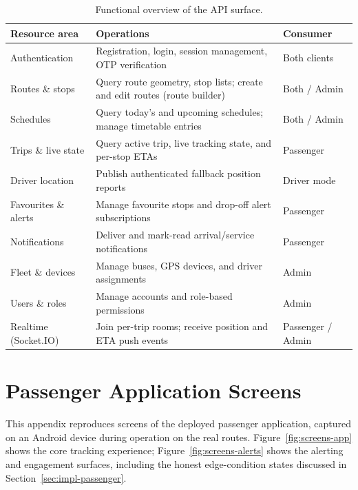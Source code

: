 \begin{table}[H]
\caption{Functional overview of the API surface.}
\label{tab:api}
\centering
\small
\begin{tabular}{@{}lp{6.6cm}l@{}}
\toprule
\textbf{Resource area} & \textbf{Operations} & \textbf{Consumer} \\
\midrule
Authentication & Registration, login, session management, OTP
verification & Both clients \\
Routes \& stops & Query route geometry, stop lists; create and edit
routes (route builder) & Both / Admin \\
Schedules & Query today's and upcoming schedules; manage timetable
entries & Both / Admin \\
Trips \& live state & Query active trip, live tracking state, and
per-stop ETAs & Passenger \\
Driver location & Publish authenticated fallback position reports &
Driver mode \\
Favourites \& alerts & Manage favourite stops and drop-off alert
subscriptions & Passenger \\
Notifications & Deliver and mark-read arrival/service notifications &
Passenger \\
Fleet \& devices & Manage buses, GPS devices, and driver assignments &
Admin \\
Users \& roles & Manage accounts and role-based permissions & Admin \\
Realtime (Socket.IO) & Join per-trip rooms; receive position and ETA
push events & Passenger / Admin \\
\bottomrule
\end{tabular}
\end{table}

\chapter{Passenger Application Screens}
\label{app:screens}
This appendix reproduces screens of the deployed passenger application,
captured on an Android device during operation on the real routes.
Figure~\ref{fig:screens-app} shows the core tracking experience;
Figure~\ref{fig:screens-alerts} shows the alerting and engagement
surfaces, including the honest edge-condition states discussed in
Section~\ref{sec:impl-passenger}.

